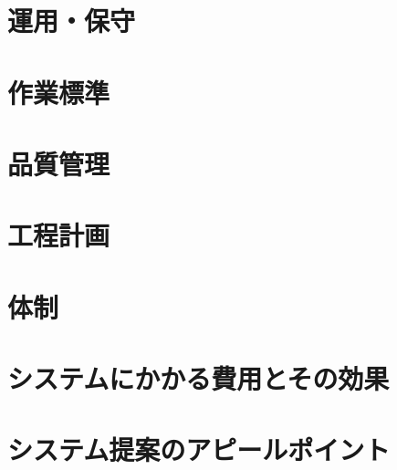 \documentclass[a4j]{jarticle}
\begin{document}
\section{運用・保守}


\section{作業標準}


\section{品質管理}


\section{工程計画}


\section{体制}


\section{システムにかかる費用とその効果}


\section{システム提案のアピールポイント}

\end{document}
